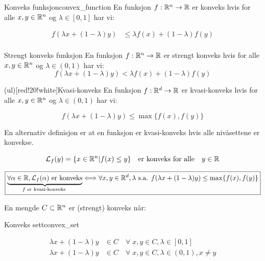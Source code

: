 \documentclass[10pt, a4paper]{article}
\begin{document}
\begin{definition}{Konveks funksjon}{convex_function}
  En funksjon \(f: \mathbb{R}^n \to \mathbb{R}\) er konveks hvis for alle \(x, y \in \mathbb{R}^n\) og \(\lambda \in [0, 1]\) har vi:

  \begin{align*}
    f(\lambda x + (1 - \lambda)y) & \leq \lambda f(x) + (1 - \lambda)f(y) \tag{Konveks} \\
  \end{align*}

  \begin{filingbox}{Strengt konveks funksjon}
    En funksjon \(f: \mathbb{R}^n \to \mathbb{R}\) er strengt konveks hvis for alle \(x, y \in \mathbb{R}^n\) og \(\lambda \in (0, 1)\) har vi:
    \[
      f(\lambda x + (1 - \lambda)y) < \lambda f(x) + (1 - \lambda)f(y)
    \]\label{def:strictly_convex}
  \end{filingbox}
  \begin{filingbox}(ul)[red!20!white]{Kvasi-konveks}
    En funksjon \(f: \mathbb{R}^d \to \mathbb{R}\) er kvasi-konveks hvis for alle \(x, y \in \mathbb{R}^n\) og \(\lambda \in (0, 1)\) har vi:

    \[
      f(\lambda x + (1 - \lambda)y) \leq \max\{f(x), f(y)\}
    \]

    En alternativ definisjon er at en funksjon er kvasi-konveks hvis alle nivåsettene er konvekse.

    \[
      \mathcal{L}_f(y) = \{x \in \mathbb{R}^n | f(x) \leq y\} \quad \text{er konveks for alle} \quad y \in \mathbb{R}
    \]

    \[
      \boxed{\underbrace{\forall \alpha \in \mathbb{R}, \mathcal{L}_f(\alpha) \text{ er konveks}}_{f \text{ er kvasi-konveks }}\Longleftrightarrow \forall x, y \in \mathbb{R}^d,\lambda \text{ s.a. } f(\lambda x + (1-\lambda)y) \leq \max \{ f(x), f(y) \}}
    \]
  \end{filingbox}\label{def:quasi_convex}

\end{definition}

En mengde \(C \subset \mathbb{R}^n\) er (strengt) konveks når:

\begin{definition}{Konveks sett}{convex_set}

  \begin{align*}
    \lambda x + (1 - \lambda)y & \in C \quad \forall \; x, y \in C, \lambda \in [0, 1] \tag{Konveks}                   \\
    \lambda x + (1 - \lambda)y & \in C \quad \forall \; x, y \in C, \lambda \in (0, 1), x \neq y \tag{Strengt konveks}
  \end{align*}

\end{definition}
\end{document}
